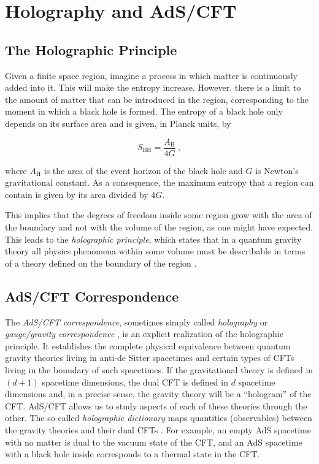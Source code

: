 \documentclass[twocolumn]{revtex4}
\providecommand{\eq}[2]{
    \begin{equation}
        #2
    \label{eq:#1}
    \end{equation}
}
\begin{document}
\section{Holography and AdS/CFT} \label{s:Holo_AdS/CFT}


\subsection{The Holographic Principle} \label{ss:Holography}

Given a finite space region, imagine a process in which matter is continuously added into it. This will make the entropy increase. However, there is a limit to the amount of matter that can be introduced in the region, corresponding to the moment in which a black hole is formed. The entropy of a black hole only depends on its surface area and is given, in Planck units, by \cite{bekenstein_black_1973, hawking_particle_1975}
\eq{BH}{
    S_\text{BH} = \frac{ A_\text{H} }{ 4 G } \ ,
}
where $A_\text{H}$ is the area of the event horizon of the black hole and $G$ is Newton's gravitational constant. As a consequence, the maximum entropy that a region can contain is given by its area divided by $4G$.

This implies that the degrees of freedom inside some region grow with the area of the boundary and not with the volume of the region, as one might have expected. This leads to the \emph{holographic principle}, which states that in a quantum gravity theory all physics phenomena within some volume must be describable in terms of a theory defined on the boundary of the region \cite{t_hooft_dimensional_2009}.


\subsection{AdS/CFT Correspondence} \label{ss:AdS/CFT}

The \emph{AdS/CFT correspondence}, sometimes simply called \emph{holography} or \emph{gauge/gravity correspondence} \cite{maldacena_large_1999}, is an explicit realization of the holographic principle. It establishes the complete physical equivalence between quantum gravity theories living in anti-de Sitter spacetimes and certain types of CFTs living in the boundary of such spacetimes. If the gravitational theory is defined in $(d+1)$ spacetime dimensions, the dual CFT is defined in $d$ spacetime dimensions and, in a precise sense, the gravity theory will be a ``hologram'' of the CFT. AdS/CFT allows us to study aspects of each of these theories through the other. The so-called \emph{holographic dictionary} maps quantities (observables) between the gravity theories and their dual CFTs \cite{witten_anti_1998}. For example, an empty AdS spacetime with no matter is dual to the vacuum state of the CFT, and an AdS spacetime with a black hole inside corresponds to a thermal state in the CFT.
\end{document}
